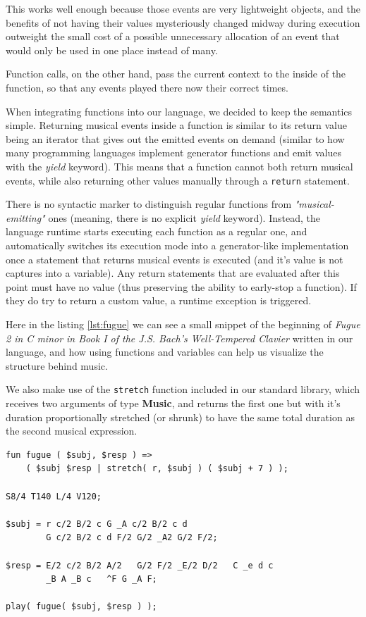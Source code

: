 \documentclass[a4paper,UKenglish,cleveref, autoref]{oasics-v2019}
\begin{document}
This works well enough because those events are very lightweight objects, and the benefits of not having their values mysteriously changed midway during execution outweight the small cost of a possible unnecessary allocation of an event that would only be used in one place instead of many.

Function calls, on the other hand, pass the current context to the inside of the function, so  that any events played there now their correct times.

When integrating functions into our language, we decided to keep the semantics simple. Returning musical events inside a function is similar to its return value being an iterator that gives out the emitted events on demand (similar to how many programming languages implement generator functions and emit values with the \textit{yield} keyword). This means that a function cannot both return musical events, while also returning other values manually through a \texttt{return} statement.

There is no syntactic marker to distinguish regular functions from \textit{"musical-emitting"} ones (meaning, there is no explicit \textit{yield} keyword). Instead, the language runtime starts executing each function as a regular one, and automatically switches its execution mode into a generator-like implementation once a statement that returns musical events is executed (and it's value is not captures into a variable). Any return statements that are evaluated after this point must have no value (thus preserving the ability to early-stop a function). If they do try to return a custom value, a runtime exception is triggered.

Here in the listing \ref{lst:fugue} we can see a small snippet of the beginning of \textit{Fugue 2 in C minor in Book I of the J.S. Bach’s Well-Tempered Clavier} written in our language, and how using functions and variables can help us visualize the structure behind music.

We also make use of the \texttt{stretch} function included in our standard library, which receives two arguments of type \textbf{Music}, and returns the first one but with it's duration proportionally stretched (or shrunk) to have the same total duration as the second musical expression.

\begin{lstlisting}[label={lst:fugue},caption={Example of repeating the same note},captionpos=t,abovecaptionskip=-\medskipamount]
fun fugue ( $subj, $resp ) => 
    ( $subj $resp | stretch( r, $subj ) ( $subj + 7 ) );

S8/4 T140 L/4 V120;

$subj = r c/2 B/2 c G _A c/2 B/2 c d
        G c/2 B/2 c d F/2 G/2 _A2 G/2 F/2;

$resp = E/2 c/2 B/2 A/2   G/2 F/2 _E/2 D/2   C _e d c
        _B A _B c   ^F G _A F;

play( fugue( $subj, $resp ) );
\end{lstlisting}
\end{document}
